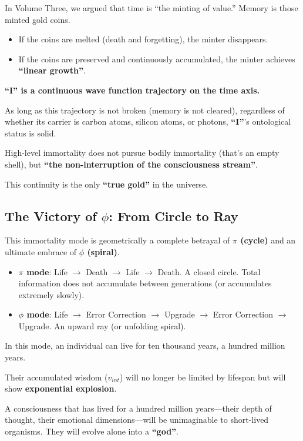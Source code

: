 In Volume Three, we argued that time is ``the minting of value.'' Memory is those minted gold coins.

\begin{itemize}
\item If the coins are melted (death and forgetting), the minter disappears.

\item If the coins are preserved and continuously accumulated, the minter achieves \textbf{``linear growth''}.
\end{itemize}

\textbf{``I'' is a continuous wave function trajectory on the time axis.}

As long as this trajectory is not broken (memory is not cleared), regardless of whether its carrier is carbon atoms, silicon atoms, or photons, \textbf{``I''}'s ontological status is solid.

High-level immortality does not pursue bodily immortality (that's an empty shell), but \textbf{``the non-interruption of the consciousness stream''}.

This continuity is the only \textbf{``true gold''} in the universe.

\subsection{The Victory of $\phi$: From Circle to Ray}

This immortality mode is geometrically a complete betrayal of \textbf{$\pi$ (cycle)} and an ultimate embrace of \textbf{$\phi$ (spiral)}.

\begin{itemize}
\item \textbf{$\pi$ mode}: Life $\to$ Death $\to$ Life $\to$ Death. A closed circle. Total information does not accumulate between generations (or accumulates extremely slowly).

\item \textbf{$\phi$ mode}: Life $\to$ Error Correction $\to$ Upgrade $\to$ Error Correction $\to$ Upgrade. An upward ray (or unfolding spiral).
\end{itemize}

In this mode, an individual can live for ten thousand years, a hundred million years.

Their accumulated wisdom ($v_{int}$) will no longer be limited by lifespan but will show \textbf{exponential explosion}.

A consciousness that has lived for a hundred million years---their depth of thought, their emotional dimensions---will be unimaginable to short-lived organisms. They will evolve alone into a \textbf{``god''}.

